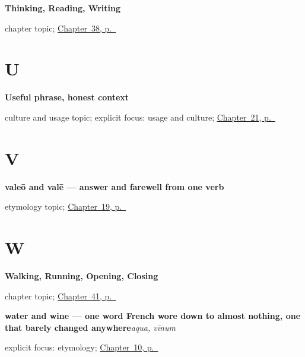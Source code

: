 \noindent\begin{minipage}[t]{\linewidth}
\raggedright
\textbf{Thinking, Reading, Writing}\par
\footnotesize chapter topic; \hyperref[ch:la-mind-verbs]{Chapter~38, p.~\pageref*{ch:la-mind-verbs}}
\end{minipage}\par\smallskip

\section*{U}

\noindent\begin{minipage}[t]{\linewidth}
\raggedright
\textbf{Useful phrase, honest context}\par
\footnotesize culture and usage topic; explicit focus: usage and culture; \hyperref[ch:la-nice-to-meet-you]{Chapter~21, p.~\pageref*{ch:la-nice-to-meet-you}}
\end{minipage}\par\smallskip

\section*{V}

\noindent\begin{minipage}[t]{\linewidth}
\raggedright
\textbf{valeō and valē — answer and farewell from one verb}\par
\footnotesize etymology topic; \hyperref[ch:la-how-are-you]{Chapter~19, p.~\pageref*{ch:la-how-are-you}}
\end{minipage}\par\smallskip

\section*{W}

\noindent\begin{minipage}[t]{\linewidth}
\raggedright
\textbf{Walking, Running, Opening, Closing}\par
\footnotesize chapter topic; \hyperref[ch:la-motion-verbs]{Chapter~41, p.~\pageref*{ch:la-motion-verbs}}
\end{minipage}\par\smallskip

\noindent\begin{minipage}[t]{\linewidth}
\raggedright
\textbf{water and wine — one word French wore down to almost nothing, one that barely changed anywhere}\enspace\emph{aqua, vīnum}\par
\footnotesize explicit focus: etymology; \hyperref[ch:la-water-wine-bread]{Chapter~10, p.~\pageref*{ch:la-water-wine-bread}}
\end{minipage}\par\smallskip

